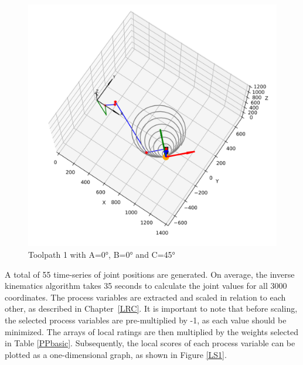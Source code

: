 \begin{figure}[H]
\begin{minipage}{0.5\textwidth}
		\includegraphics[width=\textwidth]{figures/robotANDpath1_45.png}
		\caption{Toolpath 1 with A=0°, B=0° and C=45°}
		\label{TP1+25}
	\end{minipage}\par
\end{figure}

A total of 55 time-series of joint positions are generated. On average, the inverse kinematics algorithm takes 35 seconds to calculate the joint values for all 3000 coordinates. The process variables are extracted and scaled in relation to each other, as described in Chapter~\ref{LRC}. It is important to note that before scaling, the selected process variables are pre-multiplied by -1, as each value should be minimized. The arrays of local ratings are then multiplied by the weights selected in Table \ref{PPbasic}. Subsequently, the local scores of each process variable can be plotted as a one-dimensional graph, as shown in Figure \ref{LS1}.

